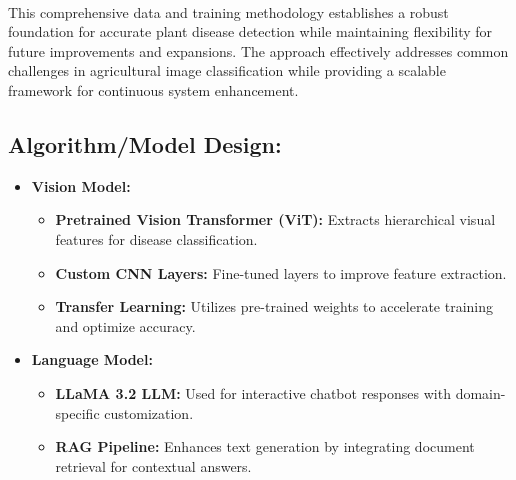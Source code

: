 \

This comprehensive data and training methodology establishes a robust foundation for accurate plant disease detection while maintaining flexibility for future improvements and expansions. The approach effectively addresses common challenges in agricultural image classification while providing a scalable framework for continuous system enhancement.



\subsection{Algorithm/Model Design:}
\begin{itemize}

\item \textbf{Vision Model:}
\begin{itemize}
\item \textbf{Pretrained Vision Transformer (ViT):} Extracts hierarchical visual features for disease classification.
\item \textbf{Custom CNN Layers:} Fine-tuned layers to improve feature extraction.
\item \textbf{Transfer Learning:} Utilizes pre-trained weights to accelerate training and optimize accuracy.
\end{itemize}

\item \textbf{Language Model:}
\begin{itemize}
\item \textbf{LLaMA 3.2 LLM:} Used for interactive chatbot responses with domain-specific customization.
\item \textbf{RAG Pipeline:} Enhances text generation by integrating document retrieval for contextual answers.
\end{itemize}

\end{itemize}

